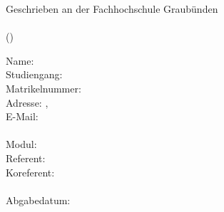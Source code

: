 \begin{titlepage}
    
    \begin{center}
        Geschrieben an der Fachhochschule Graubünden \\
        \vspace{30mm}
        \huge\textbf{\haupttitel}\\
        \hfill \break
        \large{(\untertitel)}
    \end{center}
    
    \vfill
    
    \begin{flushleft}
    Name: \autorenschaft\\
    Studiengang: \studiengang\\
    Matrikelnummer: \matrikelnummer\\
    Adresse: \adresse, \plz~\ort\\
    E-Mail: \email\\
    ~\\
    Modul: \modul\\
    Referent: \\
    Koreferent: \coRefe\\
    ~\\
    Abgabedatum: \abgabedatum
    \end{flushleft}
    
    \vspace{20mm}
    
\end{titlepage}
